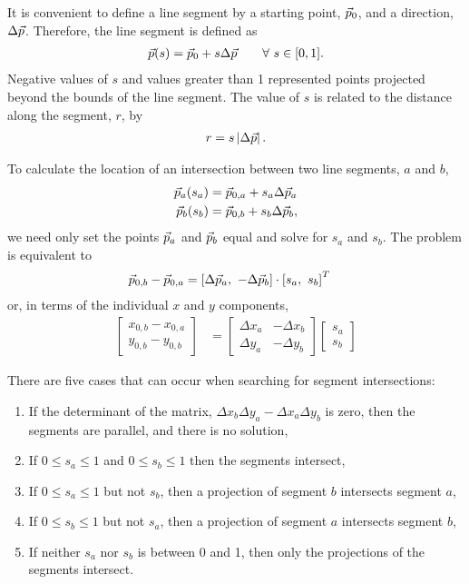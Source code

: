 It is convenient to define a line segment by a starting point, $\vec{p}_0$, and a direction, $\Delta \vec{p}$.  Therefore, the line segment is defined as
\begin{align}
\vec{p}(s) = \vec{p}_0 + s \Delta \vec{p} \hspace{2em} \forall \ s\in[0,1].
\end{align}
Negative values of $s$ and values greater than 1 represented points projected beyond the bounds of the line segment.  The value of $s$ is related to the distance along the segment, $r$, by
\begin{align}
r = s \left| \Delta \vec{p} \right|.
\end{align}

To calculate the location of an intersection between two line segments, $a$ and $b$,
\begin{align}
\vec{p}_a(s_a) &= \vec{p}_{0,a} + s_a \Delta \vec{p}_a\nonumber\\
\vec{p}_b(s_b) &= \vec{p}_{0,b} + s_b \Delta \vec{p}_b\nonumber,
\end{align}
we need only set the points $\vec{p}_a$ and $\vec{p}_b$ equal and solve for $s_a$ and $s_b$.  The problem is equivalent to
\begin{align}
\vec{p}_{0,b} - \vec{p}_{0,a} &= \left[\Delta \vec{p}_a,\ -\Delta \vec{p}_b\right] \cdot \left[s_a,\ s_b\right]^T
\end{align}
or, in terms of the individual $x$ and $y$ components,
\begin{align}
\left[\begin{array}{c}
x_{0,b} - x_{0,a}\\
y_{0,b} - y_{0,b}
\end{array}\right] &= 
\left[\begin{array}{cc}
\Delta x_a & -\Delta x_b\\
\Delta y_a & -\Delta y_b
\end{array}\right]\left[\begin{array}{c}
s_a \\
s_b
\end{array}\right]
\end{align}

There are five cases that can occur when searching for segment intersections:
\begin{enumerate}
\item If the determinant of the matrix, $\Delta x_b \Delta y_a - \Delta x_a \Delta y_b$ is zero, then the segments are parallel, and there is no solution,
\item If $0 \le s_a \le 1$ and $0 \le s_b \le 1$ then the segments intersect,
\item If $0 \le s_a \le 1$ but not $s_b$, then a projection of segment $b$ intersects segment $a$,
\item If $0 \le s_b \le 1$ but not $s_a$, then a projection of segment $a$ intersects segment $b$,
\item If neither $s_a$ nor $s_b$ is between 0 and 1, then only the projections of the segments intersect.
\end{enumerate}

